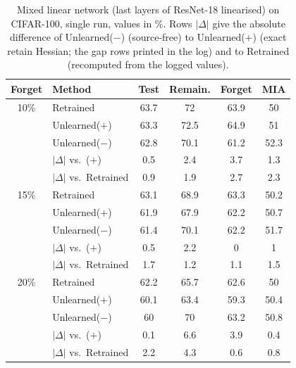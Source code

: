 \begin{table}[t]
\centering\small
\setlength{\tabcolsep}{3pt}
\begin{tabular}{@{}clcccc@{}}
\toprule
Forget & Method & Test & Remain. & Forget & MIA \\
\midrule
10\% & Retrained & 63.7 & 72 & 63.9 & 50 \\
 & Unlearned($+$) & 63.3 & 72.5 & 64.9 & 51 \\
 & Unlearned($-$) & 62.8 & 70.1 & 61.2 & 52.3 \\
 & \quad $|\Delta|$ vs.\ ($+$) & 0.5 & 2.4 & 3.7 & 1.3 \\
 & \quad $|\Delta|$ vs.\ Retrained & 0.9 & 1.9 & 2.7 & 2.3 \\
\midrule
15\% & Retrained & 63.1 & 68.9 & 63.3 & 50.2 \\
 & Unlearned($+$) & 61.9 & 67.9 & 62.2 & 50.7 \\
 & Unlearned($-$) & 61.4 & 70.1 & 62.2 & 51.7 \\
 & \quad $|\Delta|$ vs.\ ($+$) & 0.5 & 2.2 & 0 & 1 \\
 & \quad $|\Delta|$ vs.\ Retrained & 1.7 & 1.2 & 1.1 & 1.5 \\
\midrule
20\% & Retrained & 62.2 & 65.7 & 62.6 & 50 \\
 & Unlearned($+$) & 60.1 & 63.4 & 59.3 & 50.4 \\
 & Unlearned($-$) & 60 & 70 & 63.2 & 50.8 \\
 & \quad $|\Delta|$ vs.\ ($+$) & 0.1 & 6.6 & 3.9 & 0.4 \\
 & \quad $|\Delta|$ vs.\ Retrained & 2.2 & 4.3 & 0.6 & 0.8 \\
\bottomrule
\end{tabular}
\caption{Mixed linear network (last layers of ResNet-18 linearised) on CIFAR-100, single run, values in \%. Rows $|\Delta|$ give the absolute difference of Unlearned($-$) (source-free) to Unlearned($+$) (exact retain Hessian; the gap rows printed in the log) and to Retrained (recomputed from the logged values).}
\label{tab:mixed}
\end{table}
